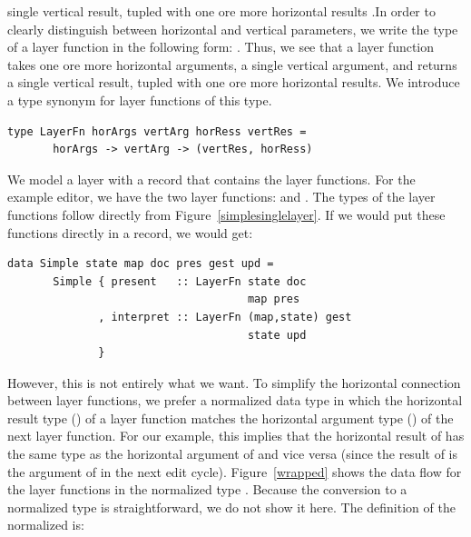 \documentclass[preprint,natbib]{sigplanconf}
\begin{document}
\bc single vertical result, tupled with one ore more horizontal results .In order to clearly distinguish between horizontal and vertical parameters, we write the type of a layer function in the following form: . Thus, we see that a layer function takes one ore more horizontal arguments, a single vertical argument, and returns a single vertical result, tupled with one ore more horizontal results. We introduce a type synonym for layer functions of this type. \ec


\begin{small}
\begin{verbatim}
type LayerFn horArgs vertArg horRess vertRes =
       horArgs -> vertArg -> (vertRes, horRess)
\end{verbatim}
\end{small}

We model a layer with a record that contains the layer functions. For the example editor, we have the two layer functions:  and . The types of the layer functions follow directly from Figure~\ref{simplesinglelayer}.  If we would put these functions directly in a record, we would get:

\begin{small}
\begin{verbatim}
data Simple state map doc pres gest upd =
       Simple { present   :: LayerFn state doc 
                                     map pres
              , interpret :: LayerFn (map,state) gest
                                     state upd
              }
\end{verbatim}
\end{small}


However, this is not entirely what we want. To simplify the horizontal connection between layer functions, we prefer a normalized data type in which the horizontal result type () of a layer function matches the horizontal argument type () of the next layer function. For our example, this implies that the horizontal result of  has the same type as the horizontal argument of  and vice versa (since the result of  is the argument of  in the next edit cycle). Figure~\ref{wrapped} shows the data flow for the layer functions in the normalized type . Because the conversion to a normalized type is straightforward, we do not show it here. The definition of the normalized  is:
\end{document}
